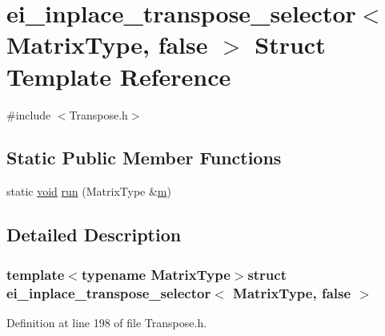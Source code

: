 \hypertarget{structei__inplace__transpose__selector_3_01_matrix_type_00_01false_01_4}{\section{ei\-\_\-inplace\-\_\-transpose\-\_\-selector$<$ Matrix\-Type, false $>$ Struct Template Reference}
\label{structei__inplace__transpose__selector_3_01_matrix_type_00_01false_01_4}
}


{\ttfamily \#include $<$Transpose.\-h$>$}

\subsection*{Static Public Member Functions}
\begin{DoxyCompactItemize}
\item 
static \hyperlink{group___u_a_v_objects_plugin_ga444cf2ff3f0ecbe028adce838d373f5c}{void} \hyperlink{structei__inplace__transpose__selector_3_01_matrix_type_00_01false_01_4_a769cae49e23c9882f231261c5a79609f}{run} (Matrix\-Type \&\hyperlink{glext_8h_af593500c283bf1a787a6f947f503a5c2}{m})
\end{DoxyCompactItemize}


\subsection{Detailed Description}
\subsubsection*{template$<$typename Matrix\-Type$>$struct ei\-\_\-inplace\-\_\-transpose\-\_\-selector$<$ Matrix\-Type, false $>$}



Definition at line 198 of file Transpose.\-h.



